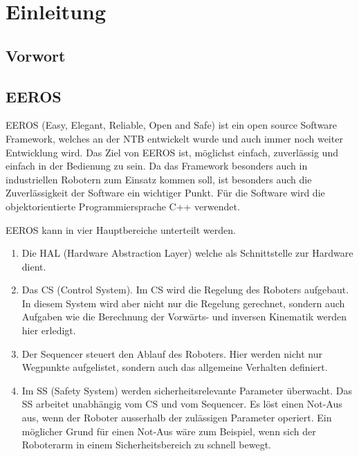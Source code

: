 \chapter{Einleitung}


\section{Vorwort}

\section{EEROS}
EEROS (Easy, Elegant, Reliable, Open and Safe) ist ein open source Software Framework, welches an der NTB entwickelt wurde und auch immer noch weiter Entwicklung wird. 
Das Ziel von EEROS ist, möglichst einfach, zuverlässig und einfach in der Bedienung zu sein.
Da das Framework besonders auch in industriellen Robotern zum Einsatz kommen soll, ist besonders auch die Zuverlässigkeit der Software ein wichtiger Punkt.
Für die Software wird die objektorientierte Programmiersprache C++ verwendet. %


EEROS kann in vier Hauptbereiche unterteilt werden.
\begin{enumerate}
\item Die HAL (Hardware Abstraction Layer) welche als Schnittstelle zur Hardware dient.
\item Das CS (Control System). Im CS wird die Regelung des Roboters aufgebaut.
In diesem System wird aber nicht nur die Regelung gerechnet, sondern auch Aufgaben wie die Berechnung der Vorwärts- und inversen Kinematik werden hier erledigt.
\item Der Sequencer steuert den Ablauf des Roboters.
Hier werden nicht nur Wegpunkte aufgelistet, sondern auch das allgemeine Verhalten definiert. %
\item Im SS (Safety System) werden sicherheitsrelevante Parameter überwacht. Das SS arbeitet unabhängig vom CS und vom Sequencer. Es löst einen Not-Aus aus, wenn der Roboter ausserhalb der zulässigen Parameter operiert. Ein möglicher Grund für einen Not-Aus wäre zum Beispiel, wenn sich der Roboterarm in einem Sicherheitsbereich zu schnell bewegt.
\end{enumerate}






